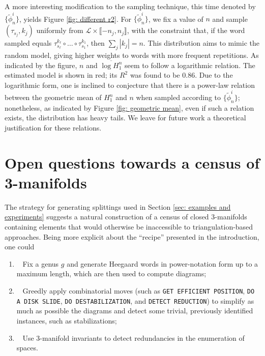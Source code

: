 \documentclass[11pt]{amsart}
\numberwithin{equation}{section}
\theoremstyle{plain}
\theoremstyle{definition}
\begin{document}
A more interesting modification to the sampling technique, this time denoted by $\{\widetilde{\phi}_{n}^i\}$, yields Figure \ref{fig: different r2}. 
For $\{\widetilde{\phi}_n^i\}$, we fix a value of $n$ and sample $(\tau_{s_j},k_j)$ uniformly from $\mathcal{L}\times\llbracket -n_j, n_j\rrbracket$, with the constraint that, if the word sampled equals $\tau_{s_\ell}^{k_\ell}\circ\dots\circ \tau_{s_1}^{k_1}$, then $\sum_j |k_j|=n$.
This distribution aims to mimic the random model, giving higher weights to words with more frequent repetitions. 
As indicated by the figure, $n$ and $\overline{\log H_1^n}$ seem to follow a logarithmic relation.
The estimated model is shown in red; its $R^2$ was found to be $0.86$.
Due to the logarithmic form, one is inclined to conjecture that there is a power-law relation between the geometric mean of $H_1^n$ and $n$ when sampled according to $\{\widetilde{\phi}_n^i\}$; nonetheless, as indicated by Figure \ref{fig: geometric mean}, even if such a relation exists, the distribution has heavy tails. 
We leave for future work a theoretical justification for these relations.

\section{Open questions towards a census of 3-manifolds}\label{sec: open questions} 
The strategy for generating splittings used in Section \ref{sec: examples and experiments} suggests a natural construction of a census of closed 3-manifolds containing elements that would otherwise be inaccessible to triangulation-based approaches. 
Being more explicit about the ``recipe'' presented in the introduction, one could
\begin{enumerate}
    \item~\label{item: postcensus1} Fix a genus $g$ and generate Heegaard words in power-notation form up to a maximum length, which are then used to compute diagrams;
    \item~\label{item: postcensus2} Greedly apply combinatorial moves (such as \texttt{GET EFFICIENT POSITION}, \texttt{DO A DISK SLIDE}, \texttt{DO DESTABILIZATION}, and \texttt{DETECT REDUCTION}) to simplify as much as possible the diagrams and detect some trivial, previously identified instances, such as stabilizations; 
    \item~\label{item: postcensus3} Use 3-manifold invariants to detect redundancies in the enumeration of spaces.
\end{enumerate}
\end{document}
